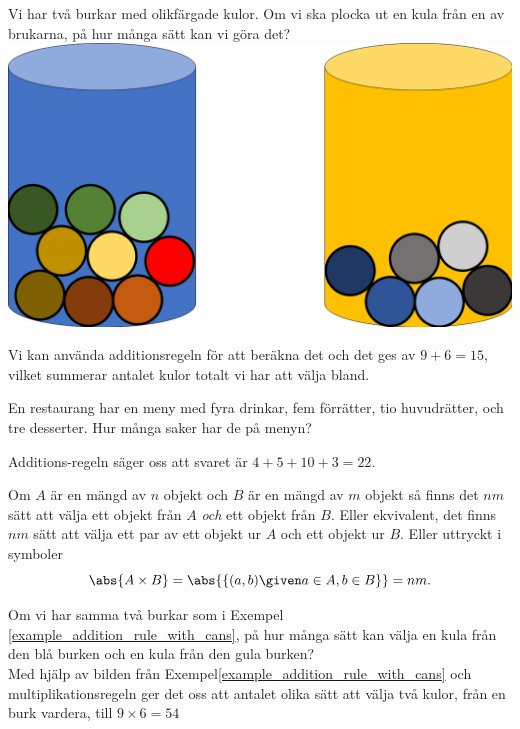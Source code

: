 \documentclass{tufte-handout}
\begin{document}
\begin{example}\label{example_addition_rule_with_cans}
    Vi har två burkar med olikfärgade kulor. Om vi ska plocka ut en kula från en av brukarna, på hur många sätt kan vi göra det?
    \includegraphics{graphics/Burkar med kulor.png}

    Vi kan använda additionsregeln för att beräkna det och det ges av $9+6=15$, vilket summerar antalet kulor totalt vi har att välja bland.
\end{example}

\begin{example}\label{example_addition_rule}
En restaurang har en meny med fyra drinkar, fem förrätter, tio huvudrätter, och tre desserter. Hur många saker har de på menyn?

Additions-regeln säger oss att svaret är $4+5+10+3 = 22$.
\end{example}

\begin{definition}
	Om $A$ är en mängd av $n$ objekt och $B$ är en mängd av $m$ objekt så finns det $nm$ sätt att välja ett objekt från $A$ \emph{och} ett objekt från $B$. Eller ekvivalent, det finns $nm$ sätt att välja ett par av ett objekt ur $A$ och ett objekt ur $B$. Eller uttryckt i symboler
$$\abs{A\times B} = \abs{\{(a,b) \given a \in A, b \in B\}} = nm.$$
\end{definition}

\begin{example}
    Om vi har samma två burkar som i Exempel \ref{example_addition_rule_with_cans}, på hur många sätt kan välja en kula från den blå burken och en kula från den gula burken?\\
    Med hjälp av bilden från Exempel\ref{example_addition_rule_with_cans} och multiplikationsregeln ger det oss att antalet olika sätt att välja två kulor, från en burk vardera, till $9\times 6 = 54$   
\end{example}
\end{document}
